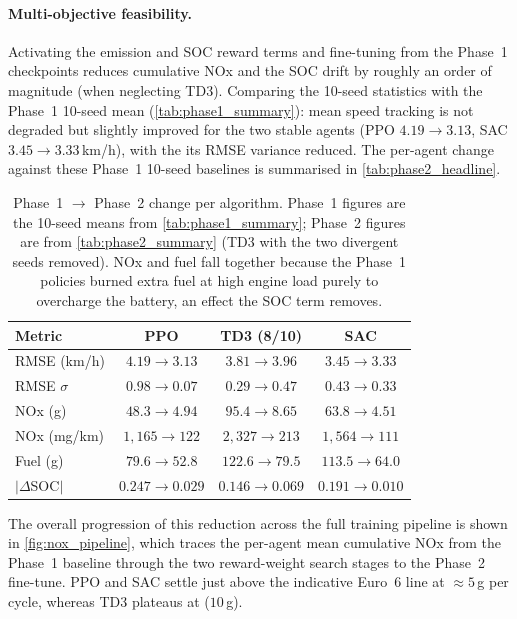 \paragraph{Multi-objective feasibility.}
Activating the emission and \ac{SOC} reward terms and fine-tuning from the Phase~1 checkpoints reduces cumulative \ac{NOx} and the \ac{SOC} drift by roughly an order of magnitude (when neglecting TD3). Comparing the 10-seed statistics with the Phase~1 10-seed mean (\autoref{tab:phase1_summary}): mean speed tracking is not degraded but slightly improved for the two stable agents (PPO $4.19 \to 3.13$, SAC $3.45 \to 3.33$\,km/h), with the its \ac{RMSE} variance reduced. The per-agent change against these Phase~1 10-seed baselines is summarised in \autoref{tab:phase2_headline}.

\begin{table}[H]
  \centering
  \small
  \begin{tabular}{lccc}
    \hline
    \textbf{Metric} & \textbf{PPO} & \textbf{TD3 (8/10)} & \textbf{SAC} \\
    \hline
    \ac{RMSE} (km/h)     & $4.19 \to 3.13$ & $3.81 \to 3.96$ & $3.45 \to 3.33$ \\
    \ac{RMSE} $\sigma$   & $0.98 \to \mathbf{0.07}$ & $0.29 \to 0.47$ & $0.43 \to 0.33$ \\
    \ac{NOx} (g)         & $48.3 \to \mathbf{4.94}$ & $95.4 \to 8.65$ & $63.8 \to \mathbf{4.51}$ \\
    \ac{NOx} (mg/km)     & $1{,}165 \to 122$ & $2{,}327 \to 213$ & $1{,}564 \to 111$ \\
    Fuel (g)             & $79.6 \to 52.8$ & $122.6 \to 79.5$ & $113.5 \to 64.0$ \\
    $|\Delta$\ac{SOC}$|$ & $0.247 \to \mathbf{0.029}$ & $0.146 \to 0.069$ & $0.191 \to \mathbf{0.010}$ \\
    \hline
  \end{tabular}
  \caption[Phase~1 to Phase~2 headline changes]{Phase~1 $\to$ Phase~2 change per algorithm. Phase~1 figures are the 10-seed means from \autoref{tab:phase1_summary}; Phase~2 figures are from \autoref{tab:phase2_summary} (TD3 with the two divergent seeds removed). \ac{NOx} and fuel fall together because the Phase~1 policies burned extra fuel at high engine load purely to overcharge the battery, an effect the \ac{SOC} term removes.}
  \label{tab:phase2_headline}
\end{table}

The overall progression of this reduction across the full training pipeline is shown in \autoref{fig:nox_pipeline}, which traces the per-agent mean cumulative \ac{NOx} from the Phase~1 baseline through the two reward-weight search stages to the Phase~2 fine-tune. PPO and SAC settle just above the indicative Euro~6 line at $\approx\!5$\,g per cycle, whereas TD3 plateaus at ($10$\,g).

